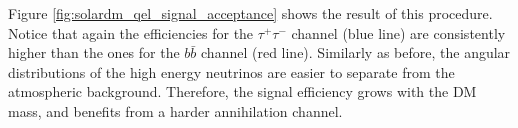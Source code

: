 Figure \ref{fig:solardm_qel_signal_acceptance} shows the result of this procedure. Notice that again the efficiencies for the $\tau^{+}\tau^{-}$ channel (blue line) are consistently higher than the ones for the $b\bar{b}$ channel (red line). Similarly as before, the angular distributions of the high energy neutrinos are easier to separate from the atmospheric background. Therefore, the signal efficiency grows with the DM mass, and benefits from a harder annihilation channel.

